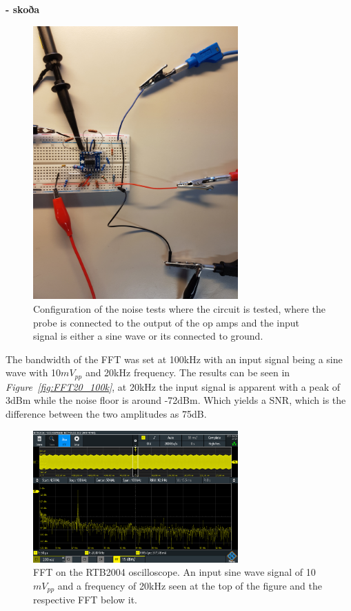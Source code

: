\textbf{%
- skoða} 

\begin{figure}[h]
    \centering
    \includegraphics[width=0.7\textwidth]{graphics/TESTINGwSineinp.jpg}
    \caption{Configuration of the noise tests where the circuit is tested, where the probe is connected to the output of the op amps and the input signal is either a sine wave or its connected to ground.}
    \label{fig:SetupFFT}
\end{figure}

The bandwidth of the FFT was set at 100kHz with an input signal being a sine wave with 10$mV_{pp}$ and 20kHz frequency.
The results can be seen in \textit{Figure~\ref{fig:FFT20_100k}}, at 20kHz the input signal is apparent with a peak of 3dBm while the noise floor is around -72dBm.
Which yields a SNR, which is the difference between the two amplitudes as 75dB.

\begin{figure}[h]
    \centering
    \includegraphics[width=0.7\textwidth]{graphics/Noise20k10mVpp100kband.PNG}
    \caption{FFT on the RTB2004 oscilloscope. An input sine wave signal of 10$mV_{pp}$ and a frequency of 20kHz seen at the top of the figure and the respective FFT below it.}
    \label{fig:FFT20k_100k}
\end{figure}




